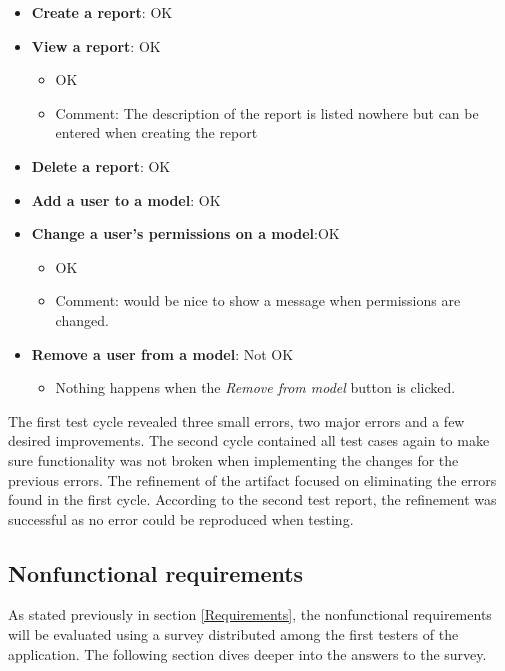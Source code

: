 \begin{itemize}
\begin{itemize}
    \end{itemize}
    \item \textbf{Create a report}: \textcolor{mutedGreen}{OK}
    \item \textbf{View a report}: \textcolor{mutedGreen}{OK}
    \begin{itemize}
        \item OK
        \item Comment: The description of the report is listed nowhere but can be entered when creating the report
    \end{itemize}
    \item \textbf{Delete a report}: \textcolor{mutedGreen}{OK}
    \item \textbf{Add a user to a model}: \textcolor{mutedGreen}{OK}
    \item \textbf{Change a user's permissions on a model}:\textcolor{mutedGreen}{OK}
    \begin{itemize}
        \item OK
        \item Comment: would be nice to show a message when permissions are changed.
    \end{itemize}
    \item \textbf{Remove a user from a model}: \textcolor{mutedPeach}{Not OK}
    \begin{itemize}
        \item Nothing happens when the \textit{Remove from model} button is clicked.
    \end{itemize}
\end{itemize}

The first test cycle revealed three small errors, two major errors and a few desired improvements.
The second cycle contained all test cases again to make sure functionality was not broken when implementing the changes for the previous errors.
The refinement of the artifact focused on eliminating the errors found in the first cycle. 
According to the second test report, the refinement was successful as no error could be reproduced when testing.

\subsection{Nonfunctional requirements}

As stated previously in section \ref{Requirements}, the nonfunctional requirements will be evaluated using a survey distributed among the first testers of the application. 
The following section dives deeper into the answers to the survey. 


